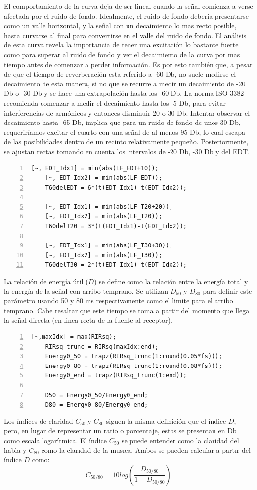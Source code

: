 El comportamiento de la curva deja de ser lineal cuando la señal comienza a verse afectada por el ruido de fondo. Idealmente, el ruido de fondo debería presentarse como un valle horizontal, y la señal con un decaimiento lo mas recto posible, hasta curvarse al final para convertirse en el valle del ruido de fondo. \hfill\break
El análisis de esta curva revela la importancia de tener una excitación lo bastante fuerte como para superar al ruido de fondo y ver el decaimiento de la curva por mas tiempo antes de comenzar a perder información. Es por esto también que, a pesar de que el tiempo de reverberación esta referido a -60 Db, no suele medirse el decaimiento de esta manera, si no que se recurre a medir un decaimiento de -20 Db o -30 Db y se hace una extrapolación hasta los -60 Db. La norma ISO-3382 recomienda comenzar a medir el decaimiento hasta los -5 Db, para evitar interferencias de armónicos y entonces disminuir 20 o 30 Db. Intentar observar el decaimiento hasta -65 Db, implica que para un ruido de fondo de unos 30 Db, requeriríamos excitar el cuarto con una señal de al menos 95 Db, lo cual escapa de las posibilidades dentro de un recinto relativamente pequeño.\hfill\break
Posteriormente, se ajustan rectas tomando en cuenta los intervalos de -20 Db, -30 Db y del EDT.
\begin{lstlisting}[frame=single,numbers=left, style=Matlab-editor, basicstyle=\tiny]
    [~, EDT_Idx1] = min(abs(LF_EDT+10));
    [~, EDT_Idx2] = min(abs(LF_EDT));
    T60delEDT = 6*(t(EDT_Idx1)-t(EDT_Idx2));
    
    [~, EDT_Idx1] = min(abs(LF_T20+20));
    [~, EDT_Idx2] = min(abs(LF_T20));
    T60delT20 = 3*(t(EDT_Idx1)-t(EDT_Idx2));
    
    [~, EDT_Idx1] = min(abs(LF_T30+30));
    [~, EDT_Idx2] = min(abs(LF_T30));
    T60delT30 = 2*(t(EDT_Idx1)-t(EDT_Idx2));
\end{lstlisting}
La relación de energía útil ($D$) se define como la relación entre la energía total y la energía de la señal con arribo temprano. Se utilizan $D_{50}$ y $D_{80}$ para definir este parámetro usando 50 y 80 ms respectivamente como el limite para el arribo temprano. Cabe resaltar que este tiempo se toma a partir del momento que llega la señal directa (en linea recta de la fuente al receptor).
\begin{lstlisting}[frame=single,numbers=left, style=Matlab-editor, basicstyle=\tiny]
    [~,maxIdx] = max(RIRsq);
    RIRsq_trunc = RIRsq(maxIdx:end);
    Energy0_50 = trapz(RIRsq_trunc(1:round(0.05*fs)));
    Energy0_80 = trapz(RIRsq_trunc(1:round(0.08*fs)));
    Energy0_end = trapz(RIRsq_trunc(1:end));
    
    D50 = Energy0_50/Energy0_end;
    D80 = Energy0_80/Energy0_end;
\end{lstlisting}
Los índices de claridad $C_{50}$ y $C_{80}$ siguen la misma definición que el índice $D$, pero, en lugar de representar un ratio o porcentaje, estos se presentan en Db como escala logarítmica. El índice $C_{50}$ se puede entender como la claridad del habla y $C_{80}$ como la claridad de la musica. Ambos se pueden calcular a partir del índice $D$ como:
$$C_{50/80} = 10 log \left( \frac{D_{50/80}}{1-D_{50/80}} \right)$$

